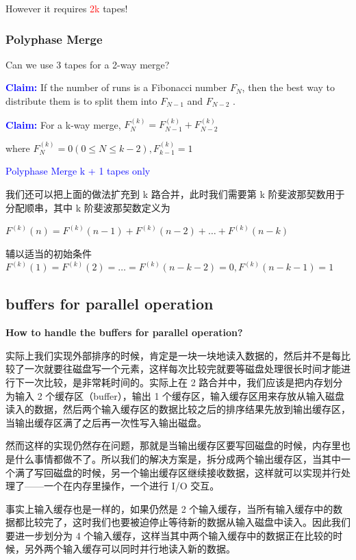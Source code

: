 \documentclass{article}
\begin{document}
However it requires \textcolor{red}{2k} tapes!

\subsubsection{Polyphase Merge}  

Can we use 3 tapes for a 2-way merge?

\textbf{\textcolor{blue}{Claim:}} If the number of runs is a Fibonacci number $F_N$, then the best way to distribute them is to split them into $F_{N-1}$ and $F_{N-2}$ .

\textbf{\textcolor{blue}{Claim:}} For a k-way merge, $F^{(k)}_N = F^{(k)}_{N-1} + F^{(k)}_{N-2}$

where $F^{(k)}_N = 0 (0 \le N \le k-2), F^{(k)}_{k-1} = 1$  

\textcolor{blue}{Polyphase Merge k + 1 tapes only}  

我们还可以把上面的做法扩充到 k 路合并，此时我们需要第 k 阶斐波那契数用于分配顺串，其中 k 阶斐波那契数定义为  
  
$F^{(k)}(n) = F^{(k)}(n-1) + F^{(k)}(n-2) + \dots + F^{(k)}(n-k)$
  
辅以适当的初始条件 $F^{(k)}(1) = F^{(k)}(2) = \dots = F^{(k)}(n-k-2) = 0,F^{(k)}(n-k-1) = 1$
  
\subsection{buffers for parallel operation}

\textbf{How to handle the buffers for parallel operation?}

实际上我们实现外部排序的时候，肯定是一块一块地读入数据的，然后并不是每比较了一次就要往磁盘写一个元素，这样每次比较完就要等磁盘处理很长时间才能进行下一次比较，是非常耗时间的。实际上在 2 路合并中，我们应该是把内存划分为输入 2 个缓存区（buffer），输出 1 个缓存区，输入缓存区用来存放从输入磁盘读入的数据，然后两个输入缓存区的数据比较之后的排序结果先放到输出缓存区，当输出缓存区满了之后再一次性写入输出磁盘。

然而这样的实现仍然存在问题，那就是当输出缓存区要写回磁盘的时候，内存里也是什么事情都做不了。所以我们的解决方案是，拆分成两个输出缓存区，当其中一个满了写回磁盘的时候，另一个输出缓存区继续接收数据，这样就可以实现并行处理了——一个在内存里操作，一个进行 I/O 交互。

事实上输入缓存也是一样的，如果仍然是 2 个输入缓存，当所有输入缓存中的数据都比较完了，这时我们也要被迫停止等待新的数据从输入磁盘中读入。因此我们要进一步划分为 4 个输入缓存，这样当其中两个输入缓存中的数据正在比较的时候，另外两个输入缓存可以同时并行地读入新的数据。
\end{document}

